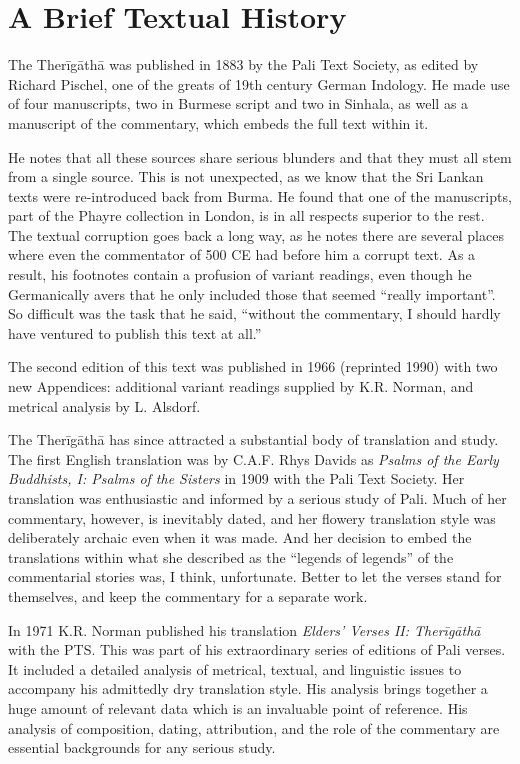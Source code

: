 \documentclass[12pt,openany]{book}%
\begin{document}
\section*{A Brief Textual History}

The \textsanskrit{Therīgāthā} was published in 1883 by the Pali Text Society, as edited by Richard Pischel, one of the greats of 19th century German Indology. He made use of four manuscripts, two in Burmese script and two in Sinhala, as well as a manuscript of the commentary, which embeds the full text within it.

He notes that all these sources share serious blunders and that they must all stem from a single source. This is not unexpected, as we know that the Sri Lankan texts were re-introduced back from Burma. He found that one of the manuscripts, part of the Phayre collection in London, is in all respects superior to the rest. The textual corruption goes back a long way, as he notes there are several places where even the commentator of 500 CE had before him a corrupt text. As a result, his footnotes contain a profusion of variant readings, even though he Germanically avers that he only included those that seemed “really important”. So difficult was the task that he said, “without the commentary, I should hardly have ventured to publish this text at all.”

The second edition of this text was published in 1966 (reprinted 1990) with two new Appendices: additional variant readings supplied by K.R. Norman, and metrical analysis by L. Alsdorf.

The \textsanskrit{Therīgāthā} has since attracted a substantial body of translation and study. The first English translation was by C.A.F. Rhys Davids as \textit{Psalms of the Early Buddhists, I: Psalms of the Sisters} in 1909 with the Pali Text Society. Her translation was enthusiastic and informed by a serious study of Pali. Much of her commentary, however, is inevitably dated, and her flowery translation style was deliberately archaic even when it was made. And her decision to embed the translations within what she described as the “legends of legends” of the commentarial stories was, I think, unfortunate. Better to let the verses stand for themselves, and keep the commentary for a separate work.

In 1971 K.R. Norman published his translation \textit{Elders’ Verses II: \textsanskrit{Therīgāthā}} with the PTS. This was part of his extraordinary series of editions of Pali verses. It included a detailed analysis of metrical, textual, and linguistic issues to accompany his admittedly dry translation style. His analysis brings together a huge amount of relevant data which is an invaluable point of reference. His analysis of composition, dating, attribution, and the role of the commentary are essential backgrounds for any serious study.
\end{document}
